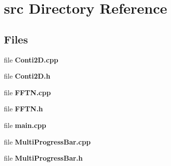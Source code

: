 \section{src Directory Reference}
\label{dir_68267d1309a1af8e8297ef4c3efbcdba}
\subsection*{Files}
\begin{DoxyCompactItemize}
\item 
file \textbf{ Conti2\+D.\+cpp}
\item 
file \textbf{ Conti2\+D.\+h}
\item 
file \textbf{ F\+F\+T\+N.\+cpp}
\item 
file \textbf{ F\+F\+T\+N.\+h}
\item 
file \textbf{ main.\+cpp}
\item 
file \textbf{ Multi\+Progress\+Bar.\+cpp}
\item 
file \textbf{ Multi\+Progress\+Bar.\+h}
\end{DoxyCompactItemize}
